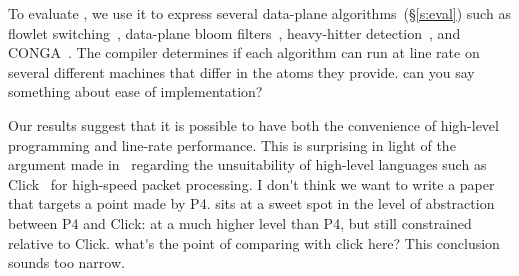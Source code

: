 To evaluate \pktlanguage, we use it to express several data-plane
algorithms~(\S\ref{s:eval}) such as flowlet switching~\cite{flowlets},
data-plane bloom filters~\cite{bloom}, heavy-hitter
detection~\cite{opensketch}, and CONGA~\cite{conga}.  The \pktlanguage compiler
determines if each algorithm can run at line rate on several different
\absmachine machines that differ in the atoms they provide. \ac{can you say
something about ease of implementation?}

Our results suggest that it is possible to have both the convenience of
high-level programming and line-rate performance. This is surprising in light
of the argument made in~\cite{p4} regarding the unsuitability of high-level
languages such as Click~\cite{click} for high-speed packet processing. 
\ac{I don't think we want to write a paper that targets a point made by P4.}
\pktlanguage sits at a sweet spot in the level of abstraction between P4 and
Click: at a much higher level than P4, but still constrained relative to Click.
\ac{what's the point of comparing with click here? This conclusion sounds too narrow.}
